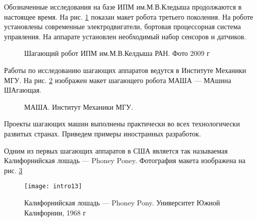 Обозначенные исследования на базе ИПМ им.М.В.Кледыша продолжаются в настоящее время. На рис. \ref{img:IPM_now} показан макет робота третьего поколения. На роботе установлены современные электродвигатели, бортовая процессорная система управления. На аппарате установлен необходимый набор сенсоров и датчиков.

\begin{figure}[h]
  \begin{minipage}[h]{0.49\linewidth}
  \end{minipage}
  \hfill
  \begin{minipage}[h]{0.49\linewidth}
  \end{minipage}
  \caption{Шагающий робот ИПМ им.М.В.Келдыша РАН. Фото 2009 г}
  \label{img:IPM_now}  
\end{figure}

Работы по исследованию шагающих аппаратов ведутся в Институте Механики МГУ. На рис. \ref{img:masha} изображен макет шагающего робота МАША --- МАшина ШАгающая.

\begin{figure}[h]
  \begin{minipage}[h]{0.49\linewidth}
  \end{minipage}
  \hfill
  \begin{minipage}[h]{0.49\linewidth}
  \end{minipage}
  \caption{МАША. Институт Механики МГУ.}
  \label{img:masha}  
\end{figure}

Проекты шагающих машин выполнены практически во всех технологически развитых странах. Приведем примеры иностранных разработок.

Одним из первых шагающих аппаратов в США является так называемая Калифорнийская лошадь --- Phoney Poney. Фотография макета изображена на рис. \ref{img:phoney_poney}

\begin{figure}[h]
\centering
\texttt{[image: intro13]}
\caption{Калифорнийская лошадь --- Phoney Pony. Университет Южной Калифорнии, 1968 г }
\label{img:phoney_poney}
\end{figure}

